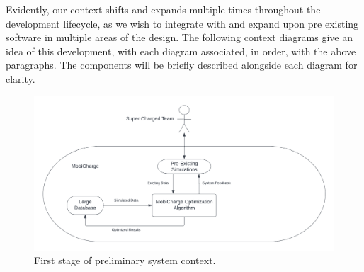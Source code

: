 \documentclass[12pt, titlepage]{article}
\begin{document}
\par
Evidently, our context shifts and expands multiple times throughout the development lifecycle, as we wish to integrate with and expand upon pre existing software in multiple areas of the design. The following context diagrams give an idea of this development, with each diagram associated, in order, with the above paragraphs. The components will be briefly described alongside each diagram for clarity.

\begin{figure}[htp]
    \centering
    \includegraphics[width=15cm]{images/context0.png}
    \caption[Prelim System Contexts 1]{First stage of preliminary system context.}
    \label{fig:figure1}
\end{figure}
\end{document}
